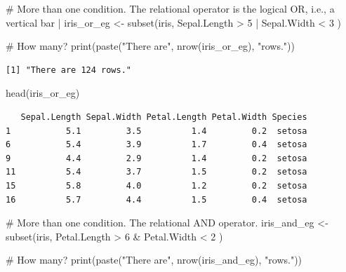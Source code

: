 \documentclass[
  letterpaper,
]{book}
\newenvironment{Shaded}{\begin{snugshade}}{\end{snugshade}}
\newcommand{\CommentTok}[1]{\textcolor[rgb]{0.37,0.37,0.37}{#1}}
\newcommand{\DecValTok}[1]{\textcolor[rgb]{0.68,0.00,0.00}{#1}}
\newcommand{\FunctionTok}[1]{\textcolor[rgb]{0.28,0.35,0.67}{#1}}
\newcommand{\NormalTok}[1]{\textcolor[rgb]{0.00,0.23,0.31}{#1}}
\newcommand{\OtherTok}[1]{\textcolor[rgb]{0.00,0.23,0.31}{#1}}
\newcommand{\SpecialCharTok}[1]{\textcolor[rgb]{0.37,0.37,0.37}{#1}}
\newcommand{\StringTok}[1]{\textcolor[rgb]{0.13,0.47,0.30}{#1}}
\begin{document}
\begin{Shaded}
\begin{Highlighting}[]
\CommentTok{\# More than one condition. The relational operator is the logical OR, i.e., a vertical bar |}
\NormalTok{iris\_or\_eg }\OtherTok{\textless{}{-}} \FunctionTok{subset}\NormalTok{(iris, Sepal.Length }\SpecialCharTok{\textgreater{}} \DecValTok{5} \SpecialCharTok{|}\NormalTok{ Sepal.Width }\SpecialCharTok{\textless{}} \DecValTok{3}\NormalTok{ )}

\CommentTok{\# How many?}
\FunctionTok{print}\NormalTok{(}\FunctionTok{paste}\NormalTok{(}\StringTok{"There are"}\NormalTok{, }\FunctionTok{nrow}\NormalTok{(iris\_or\_eg), }\StringTok{"rows."}\NormalTok{))}
\end{Highlighting}
\end{Shaded}

\begin{verbatim}
[1] "There are 124 rows."
\end{verbatim}

\begin{Shaded}
\begin{Highlighting}[]
\FunctionTok{head}\NormalTok{(iris\_or\_eg)}
\end{Highlighting}
\end{Shaded}

\begin{verbatim}
   Sepal.Length Sepal.Width Petal.Length Petal.Width Species
1           5.1         3.5          1.4         0.2  setosa
6           5.4         3.9          1.7         0.4  setosa
9           4.4         2.9          1.4         0.2  setosa
11          5.4         3.7          1.5         0.2  setosa
15          5.8         4.0          1.2         0.2  setosa
16          5.7         4.4          1.5         0.4  setosa
\end{verbatim}

\begin{Shaded}
\begin{Highlighting}[]
\CommentTok{\# More than one condition. The relational AND operator.}
\NormalTok{iris\_and\_eg }\OtherTok{\textless{}{-}} \FunctionTok{subset}\NormalTok{(iris, Petal.Length }\SpecialCharTok{\textgreater{}} \DecValTok{6} \SpecialCharTok{\&}\NormalTok{ Petal.Width }\SpecialCharTok{\textless{}} \DecValTok{2}\NormalTok{ )}

\CommentTok{\# How many?}
\FunctionTok{print}\NormalTok{(}\FunctionTok{paste}\NormalTok{(}\StringTok{"There are"}\NormalTok{, }\FunctionTok{nrow}\NormalTok{(iris\_and\_eg), }\StringTok{"rows."}\NormalTok{))}
\end{Highlighting}
\end{Shaded}
\end{document}
